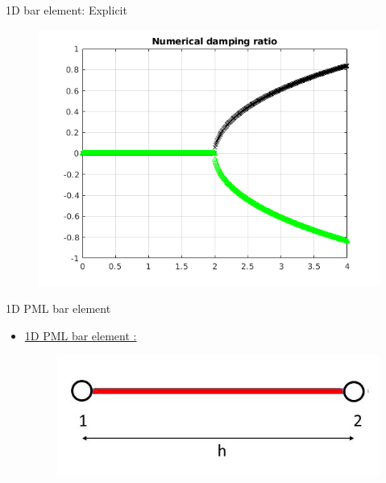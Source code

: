 \begin{frame}{1D bar element: Explicit}
\begin{figure}[ht]
\begin{minipage}[b]{0.5\linewidth}
  \end{minipage}%
  \begin{minipage}[b]{0.5\linewidth}
    \centering
    \includegraphics[scale=.35]{images/bar-exp-4.png} \\

  \end{minipage} 
\end{figure}
\end{frame}


\begin{frame}{1D PML bar element}
\begin{itemize}
\item \underline{1D PML bar element :}
\begin{figure}
\centering
\includegraphics[width=0.5\linewidth]{images/bar-element-pml.jpg}
\end{figure}
\end{itemize}
\end{frame}

